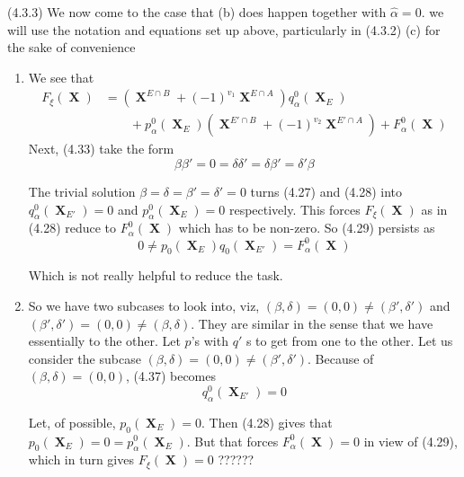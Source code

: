 \documentclass[a4paper,12pt]{article}
\DeclareMathOperator{\x}{\mathrm{X}}
\theoremstyle{definition}
\theoremstyle{underlinethm}
\theoremstyle{definition}
\begin{document}
\begin{enumerate}[label=(\alph*)]
(4.3.3) We now come to the case that (b) does happen together with $\hat{\alpha} =0$. we will use the notation and equations set up above, particularly in (4.3.2) (c) for the sake of convenience 
\begin{enumerate}[label=(\alph*)]
\item We see that
\begin{align*}
F_{\xi}(\boldsymbol{\x})& = \left(\boldsymbol{\x}^{E \cap B}  + (-1)^{v_{1}} \boldsymbol{\x}^{E \cap A}\right) q_{\alpha}^{0} (\boldsymbol{\x}_{E})\\
 &\qquad + p_{\alpha}^{0} (\boldsymbol{\x}_{E}) (\boldsymbol{\x}^{E' \cap B} + (-1)^{v_{2}} \boldsymbol{\x}^{E' \cap A}) + F_{\alpha}^{0}(\boldsymbol{\x})\tag{4.35}\label{eq-4.35}
\end{align*}
 Next, (4.33) take the form
 \begin{equation}
 \beta\beta' = 0 = \delta\delta' = \delta \beta' = \delta'\beta\tag{4.36}\label{eq-4.36}
 \end{equation}

The trivial solution $\beta = \delta = \beta' = \delta' = 0$ turns  (4.27) and (4.28) into $q_{\alpha}^{0} (\boldsymbol{\x}_{E'}) = 0$ and $p_{\alpha}^{0}(\boldsymbol{\x}_{E})=0$ respectively. This forces $F_{\xi}(\boldsymbol{\x})$ as in (4.28) reduce to $F_{\alpha}^{0}(\boldsymbol{\x})$ which has to be non-zero. So (4.29) persists as
\begin{equation}
0 \neq p_{0}(\boldsymbol{\x}_{E}) q_{0}(\boldsymbol{\x}_{E'}) = F_{\alpha}^{0}(\boldsymbol{\x})\tag{4.37}\label{eq-4.37}
\end{equation}

Which is not really helpful to reduce the task.

\item So we have two subcases to look into, viz, $(\beta, \delta) =(0,0) \neq (\beta', \delta')$ and $(\beta', \delta') = (0,0) \neq (\beta, \delta)$. They are similar in the sense that we have essentially to the other. Let $p$'s with $q'$ s to get from one to the other. Let us consider the subcase $(\beta, \delta) =(0,0) \neq (\beta', \delta')$. Because of $(\beta, \delta) = (0,0)$, (4.37) becomes 
\begin{equation}
q_{\alpha}^{0}(\boldsymbol{\x}_{E'})= 0\tag{4.38}\label{eq-4.38}
\end{equation}  

Let, of possible, $p_{0}(\boldsymbol{\x}_{E})=0$. Then (4.28) gives that $p_{0}(\boldsymbol{\x}_{E})=0 = p_{\alpha}^{0}(\boldsymbol{\x}_{E})$. But that forces $F_{\alpha}^{0}(\boldsymbol{\x})=0$ in view of (4.29), which in turn gives $F_{\xi}(\boldsymbol{\x})=0$ ??????


\end{enumerate}
\end{enumerate}
\end{document}
